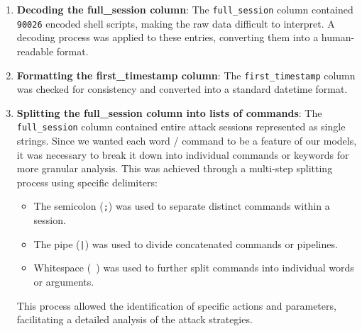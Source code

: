         \begin{enumerate}
        
            \item \textbf{Decoding the \textbf{full\_session} column}: The \texttt{full\_session} column contained \texttt{90026} encoded shell scripts, making the raw data difficult to interpret. A decoding process was applied to these entries, converting them into a human-readable format.
            
            \vspace{0.2em}
            
            \item \textbf{Formatting the \textbf{first\_timestamp} column}: The \texttt{first\_timestamp} column was checked for consistency and converted into a standard datetime format.
            
            \vspace{0.2em}
            
            \item \textbf{Splitting the \textbf{full\_session} column into lists of commands}: 
            The \texttt{full\_session} column contained entire attack sessions represented as single strings. Since we wanted each word / command to be a feature of our models, it was necessary to break it down into individual commands or keywords for more granular analysis. This was achieved through a multi-step splitting process using specific delimiters:
            
            \vspace{0.3em}
            
            \begin{itemize}
                \item The semicolon (\texttt{;}) was used to separate distinct commands within a session.
                \item The pipe (\texttt{|}) was used to divide concatenated commands or pipelines.
                \item Whitespace (\texttt{ }) was used to further split commands into individual words or arguments.
            \end{itemize}
            
            \vspace{0.3em}
            
            This process allowed the identification of specific actions and parameters, facilitating a detailed analysis of the attack strategies.
            

\end{enumerate}
